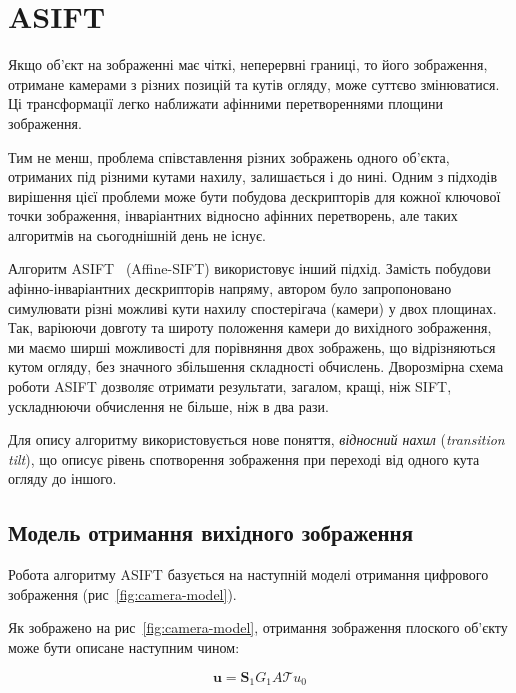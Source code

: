 \chapter{ASIFT}
Якщо об'єкт на зображенні має чіткі, неперервні границі, то його зображення, отримане камерами з різних позицій та кутів огляду, може суттєво змінюватися. Ці трансформації легко наближати афінними перетвореннями площини зображення.

Тим не менш, проблема співставлення різних зображень одного об'єкта, отриманих під різними кутами нахилу, залишається і до нині. Одним з підходів вирішення цієї проблеми може бути побудова дескрипторів для кожної ключової точки зображення, інваріантних відносно афінних перетворень, але таких алгоритмів на сьогоднішній день не існує. 

Алгоритм ASIFT~\cite{Morel2009} (Affine-SIFT) використовує інший підхід. Замість побудови афінно-інваріантних дескрипторів напряму, автором було запропоновано симулювати різні можливі кути нахилу спостерігача (камери) у двох площинах. Так, варіюючи довготу та широту положення камери до вихідного зображення, ми маємо ширші можливості для порівняння двох зображень, що відрізняються кутом огляду, без значного збільшення складності обчислень. Дворозмірна схема роботи ASIFT дозволяє отримати результати, загалом, кращі, ніж SIFT, ускладнюючи обчислення не більше, ніж в два рази. 

Для опису алгоритму використовується нове поняття, \textit{відносний нахил} (\textit{transition tilt}), що описує рівень спотворення зображення при переході від одного кута огляду до іншого. 

\section{Модель отримання вихідного зображення}
Робота алгоритму ASIFT базується на наступній моделі отримання цифрового зображення (рис~\ref{fig:camera-model}).


Як зображено на рис~\ref{fig:camera-model}, отримання зображення плоского об'єкту може бути описане наступним чином:

\begin{equation}
  \textbf{u}=\textbf{S}_1G_1A\mathcal{T}u_0
\end{equation}

